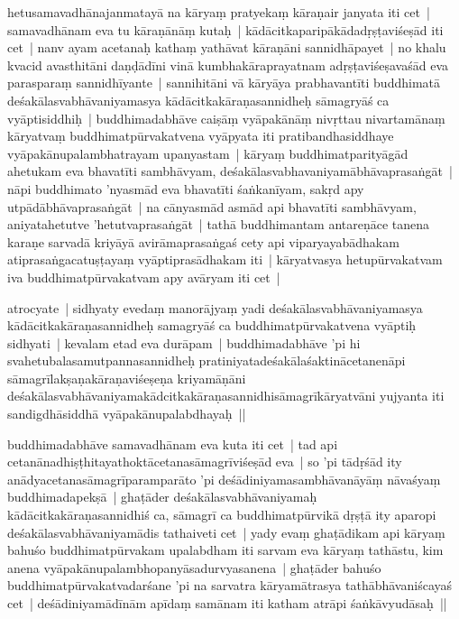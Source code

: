 \documentclass[article,a4paper]{memoir}
\begin{document}
	  \pstart hetusamavadhā\-najanmatayā\- na kā\-ryaṃ pratyekaṃ kā\-raṇair janyata iti cet | samavadhā\-nam eva tu kā\-raṇā\-nā\-ṃ kutaḥ | kā\-dā\-citkaparipā\-kā\-dadṛṣṭaviśeṣā\-d iti cet | nanv ayam acetanaḥ kathaṃ yathā\-vat kā\-raṇā\-ni sannidhā\-payet | no khalu kvacid avasthitā\-ni daṇḍā\-dī\-ni vinā\- kumbhakā\-raprayatnam adṛṣṭaviśeṣavaśā\-d eva parasparaṃ sannidhī\-yante | sannihitā\-ni vā\- kā\-ryā\-ya prabhavantī\-ti buddhimatā\- deśakā\-lasvabhā\-vaniyamasya kā\-dā\-citkakā\-raṇasannidheḥ sā\-magryā\-ś ca vyā\-ptisiddhiḥ | buddhimadabhā\-ve caiṣā\-ṃ vyā\-pakā\-nā\-ṃ nivṛttau nivartamā\-naṃ kā\-ryatvaṃ buddhimatpū\-rvakatvena vyā\-pyata iti pratibandhasiddhaye vyā\-pakā\-nupalambhatrayam upanyastam |  kā\-ryaṃ buddhimatparityā\-gā\-d ahetukam eva bhavatī\-ti sambhā\-vyam, deśakā\-lasvabhavaniyamā\-bhā\-vaprasaṅgā\-t | nā\-pi buddhimato 'nyasmā\-d eva bhavatī\-ti śaṅkanī\-yam, sakṛd apy utpā\-dā\-bhā\-vaprasaṅgā\-t | na cā\-nyasmā\-d asmā\-d api bhavatī\-ti sambhā\-vyam, aniyatahetutve 'hetutvaprasaṅgā\-t | tathā\- buddhimantam antareṇā\-ce tanena karaṇe sarvadā\- kriyā\-yā\- avirā\-maprasaṅgaś cety api viparyayabā\-dhakam atiprasaṅgacatuṣṭayaṃ vyā\-ptiprasā\-dhakam iti | kā\-ryatvasya hetupū\-rvakatvam iva buddhimatpū\-rvakatvam apy avā\-ryam iti cet |
	\pend
      

	  \pstart atrocyate | sidhyaty evedaṃ manorā\-jyaṃ yadi deśakā\-lasvabhā\-vaniyamasya kā\-dā\-citkakā\-raṇasannidheḥ samagryā\-ś ca buddhimatpū\-rvakatvena vyā\-ptiḥ sidhyati | kevalam etad eva durā\-pam | buddhimadabhā\-ve 'pi hi svahetubalasamutpannasannidheḥ pratiniyatadeśakā\-laśaktinā\-cetanenā\-pi sā\-magrī\-lakṣaṇakā\-raṇaviśeṣeṇa kriyamā\-ṇā\-ni deśakā\-lasvabhā\-vaniyamakā\-dcitkakā\-raṇasannidhisā\-magrī\-kā\-ryatvā\-ni yujyanta iti sandigdhā\-siddhā\- vyā\-pakā\-nupalabdhayaḥ ||
	\pend
      

	  \pstart buddhimadabhā\-ve samavadhā\-nam eva kuta iti cet | tad api cetanā\-nadhiṣṭhitayathoktā\-cetanasā\-magrī\-viśeṣā\-d eva | so 'pi tā\-dṛśā\-d ity anā\-dyacetanasā\-magrī\-paramparā\-to 'pi deśā\-diniyamasambhā\-vanā\-yā\-ṃ nā\-vaśyaṃ buddhimadapekṣā\- | ghaṭā\-der deśakā\-lasvabhā\-vaniyamaḥ kā\-dā\-citkakā\-raṇasannidhiś ca, sā\-magrī\- ca buddhimatpū\-rvikā\- dṛṣṭā\- ity aparopi deśakā\-lasvabhā\-vaniyamā\-dis tathaiveti cet | yady evaṃ ghaṭā\-dikam api kā\-ryaṃ bahuśo buddhimatpū\-rvakam upalabdham iti sarvam eva kā\-ryaṃ tathā\-stu, kim anena vyā\-pakā\-nupalambhopanyā\-sadurvyasanena | ghaṭā\-der bahuśo buddhimatpū\-rvakatvadarśane 'pi na sarvatra kā\-ryamā\-trasya tathā\-bhā\-vaniścayaś cet | deśā\-diniyamā\-dī\-nā\-m apī\-daṃ samā\-nam iti katham atrā\-pi śaṅkā\-vyudā\-saḥ ||
	\pend
      
\end{document}
